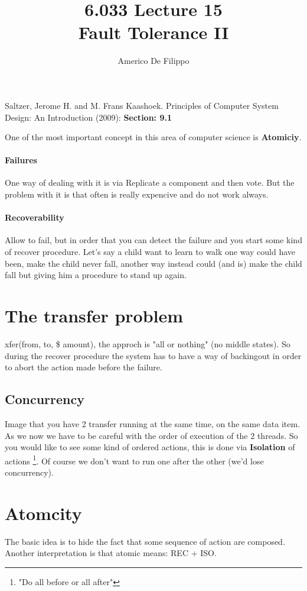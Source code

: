 \documentclass{article}
\title{6.033 Lecture 15 \\ Fault Tolerance II}
\author{Americo De Filippo}
\begin{document}
 
  \maketitle
  \begin{thebibliography}{9}
    Saltzer, Jerome H. and M. Frans Kaashoek. Principles of Computer System Design: An Introduction (2009): \textbf{Section: 9.1}
  \end{thebibliography}
  \maketitle
  One of the most important concept in this area of computer science is \textbf{Atomiciy}.
  \paragraph{Failures} One way of dealing with it is via Replicate a component and then vote.
    But the problem with it is that often is really expencive and do not work always.
  \paragraph{Recoverability} Allow to fail, but in order that you can detect the failure 
    and you start some kind of recover procedure. Let's say a child want to learn to walk 
    one way could have been, make the child never fall, another way instead could (and is)
    make the child fall but giving him a procedure to stand up again.
  \section{The transfer problem}
    xfer(from, to, \$ amount), the approch is "all or nothing" (no middle states). So during 
    the recover procedure the system has to have a way of backingout in order to abort the
    action made before the failure.
    \subsection{Concurrency}
      Image that you have 2 transfer running at the same time, on the same data item. As we 
      now we have to be careful with the order of execution of the 2 threads. So you would like
      to see some kind of ordered actions, this is done via \textbf{Isolation} of actions 
      \footnote{"Do all before or all after"}.
      Of course we don't want to run one after the other (we'd lose concurrency).
  \section{Atomcity}
    The basic idea is to hide the fact that some sequence of action are composed. Another
    interpretation is that atomic means: REC + ISO.
\end{document}
